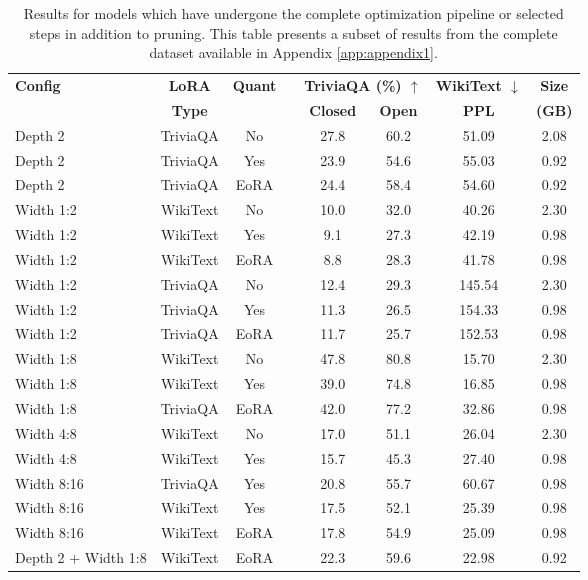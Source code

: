 {\footnotesize
\begin{table}[htbp]
\centering
\footnotesize
\caption[Results for Complete Pipeline Configurations (Subset)]{Results for models which have undergone the complete optimization pipeline or selected steps in addition to pruning. This table presents a subset of results from the complete dataset available in Appendix \ref{app:appendix1}.} \label{tab:complete_pipeline_results}
\begin{tabular}{lcclcccc}
\hline
\textbf{Config} & \textbf{LoRA} & \textbf{Quant} & & \multicolumn{2}{c}{\textbf{TriviaQA (\%) $\uparrow$}} & \textbf{WikiText $\downarrow$} & \textbf{Size} \\
\cline{5-6}
& \textbf{Type} & & & \textbf{Closed} & \textbf{Open} & \textbf{PPL} & \textbf{(GB)} \\
\hline
Depth 2 & TriviaQA & No & & 27.8 & 60.2 & 51.09 & 2.08 \\
Depth 2 & TriviaQA & Yes & & 23.9 & 54.6 & 55.03 & 0.92 \\
Depth 2 & TriviaQA & EoRA & & 24.4 & 58.4 & 54.60 & 0.92 \\
Width 1:2 & WikiText & No & & 10.0 & 32.0 & 40.26 & 2.30 \\
Width 1:2 & WikiText & Yes & & 9.1 & 27.3 & 42.19 & 0.98 \\
Width 1:2 & WikiText & EoRA & & 8.8 & 28.3 & 41.78 & 0.98 \\
Width 1:2 & TriviaQA & No & & 12.4 & 29.3 & 145.54 & 2.30 \\
Width 1:2 & TriviaQA & Yes & & 11.3 & 26.5 & 154.33 & 0.98 \\
Width 1:2 & TriviaQA & EoRA & & 11.7 & 25.7 & 152.53 & 0.98 \\
Width 1:8 & WikiText & No & & 47.8 & 80.8 & 15.70 & 2.30 \\
Width 1:8 & WikiText & Yes & & 39.0 & 74.8 & 16.85 & 0.98 \\
Width 1:8 & TriviaQA & EoRA & & 42.0 & 77.2 & 32.86 & 0.98 \\
Width 4:8 & WikiText & No & & 17.0 & 51.1 & 26.04 & 2.30 \\
Width 4:8 & WikiText & Yes & & 15.7 & 45.3 & 27.40 & 0.98 \\
Width 8:16 & TriviaQA & Yes & & 20.8 & 55.7 & 60.67 & 0.98 \\
Width 8:16 & WikiText & Yes & & 17.5 & 52.1 & 25.39 & 0.98 \\
Width 8:16 & WikiText & EoRA & & 17.8 & 54.9 & 25.09 & 0.98 \\
Depth 2 + Width 1:8 & WikiText & EoRA & & 22.3 & 59.6 & 22.98 & 0.92 \\

\end{tabular}
\end{table}}
